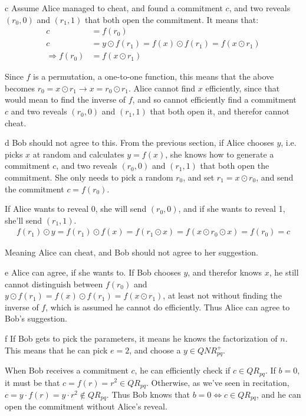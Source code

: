 \documentclass{article}
\begin{document}
\begin{paragraph}
    c Assume Alice managed to cheat, and found a commitment \(c\), and two reveals \((r_0, 0)\) and \((r_1, 1)\) that both open the commitment. It means that:
    \begin{align*}
        c &= f(r_0)\\
        c &= y \odot f(r_1) = f(x) \odot f(r_1) = f(x \odot r_1) \\
        \Rightarrow f(r_0) &= f(x \odot r_1)
    \end{align*}
    
    Since \(f\) is a permutation, a one-to-one function, this means that the above becomes \(r_0 = x \odot r_1 \rightarrow x = r_0 \odot r_1\). Alice cannot find \(x\) efficiently, since that would mean to find the inverse of \(f\), and so cannot efficiently find a commitment \(c\) and two reveals \((r_0, 0)\) and \((r_1, 1)\) that both open it, and therefor cannot cheat.
\end{paragraph}

\begin{paragraph}
    d Bob should not agree to this. From the previous section, if Alice chooses \(y\), i.e. picks \(x\) at random and calculates \(y = f(x)\), she knows how to generate a commitment \(c\), and two reveals \((r_0, 0)\) and \((r_1, 1)\) that both open the commitment. She only needs to pick a random \(r_0\), and set \(r_1 = x \odot r_0\), and send the commitment \(c = f(r_0)\).
    
    If Alice wants to reveal 0, she will send \((r_0, 0)\), and if she wants to reveal 1, she'll send \((r_1, 1)\).
    \begin{align*}
        f(r_1) \odot y = f(r_1) \odot f(x) = f(r_1 \odot x) = f(x \odot r_0 \odot x) = f(r_0) = c
    \end{align*}
    
    Meaning Alice can cheat, and Bob should not agree to her suggestion.
\end{paragraph}

\begin{paragraph}
    e Alice can agree, if she wants to. If Bob chooses \(y\), and therefor knows \(x\), he still cannot distinguish between \(f(r_0)\) and \(y \odot f(r_1) = f(x) \odot f(r_1) = f(x \odot r_1)\), at least not without finding the inverse of \(f\), which is assumed he cannot do efficiently. Thus Alice can agree to Bob's suggestion.
\end{paragraph}

\begin{paragraph}
    f If Bob gets to pick the parameters, it means he knows the factorization of \(n\). This means that he can pick \(e = 2\), and choose a \(y \in QNR^+_{pq}\).
    
    When Bob receives a commitment \(c\), he can efficiently check if \(c \in QR_{pq}\). If \(b = 0\), it must be that \(c = f(r) = r^2 \in QR_{pq}\). Otherwise, as we've seen in recitation, \(c = y \cdot f(r) = y \cdot r^2 \not\in QR_{pq}\). Thus Bob knows that \(b = 0 \iff c \in QR_{pq}\), and he can open the commitment without Alice's reveal.
\end{paragraph}
\end{document}
